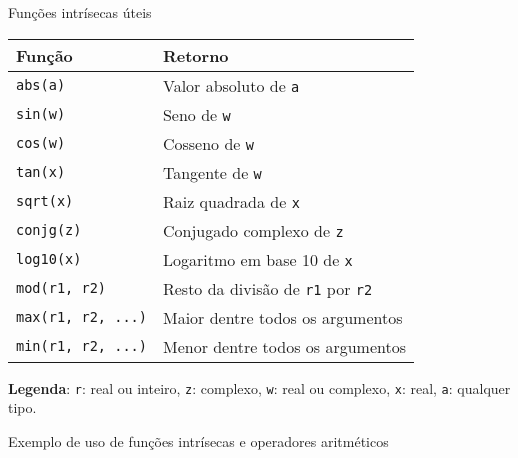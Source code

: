 \begin{frame}[fragile]{Funções intrísecas úteis}

    \begin{table}[ht]
        \centering
        \begin{tabular}{ll}
            \toprule
            \textbf{Função} & \textbf{Retorno} \\
            \midrule
                \texttt{abs(a)} & Valor absoluto de \texttt{a} \\
                \texttt{sin(w)} & Seno de \texttt{w} \\
                \texttt{cos(w)} & Cosseno de \texttt{w} \\
                \texttt{tan(x)} & Tangente de \texttt{w} \\
                \texttt{sqrt(x)} & Raiz quadrada de \texttt{x} \\
                \texttt{conjg(z)} & Conjugado complexo de \texttt{z} \\
                \texttt{log10(x)} & Logaritmo em base 10 de \texttt{x} \\
                \texttt{mod(r1, r2)} & Resto da divisão de \texttt{r1} por \texttt{r2} \\
                \texttt{max(r1, r2, ...)} & Maior dentre todos os argumentos \\
                \texttt{min(r1, r2, ...)} & Menor dentre todos os argumentos \\
            \bottomrule
        \end{tabular}
    \end{table}

    \vspace{0.2in}

    \textbf{Legenda}: {\texttt{r}: real ou inteiro, \texttt{z}: complexo, \texttt{w}: real ou 
        complexo, \texttt{x}: real, \texttt{a}: qualquer tipo.}
\end{frame}

\begin{frame}[fragile]{Exemplo de uso de funções intrísecas e operadores aritméticos}
\end{frame}

